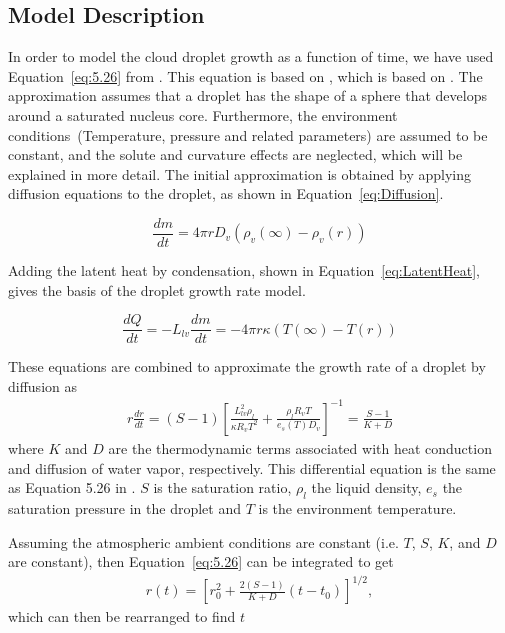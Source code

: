 \documentclass[titlepage]{article}
\begin{document}
\subsection{Model Description}
In order to model the cloud droplet growth as a function of time, we have used
Equation~\eqref{eq:5.26} from \cite{Curry}. This equation is based on
\cite{Mason}, which is based on \cite{Best}. The approximation assumes that a
droplet has the shape of a sphere that develops around a saturated nucleus
core. Furthermore, the environment conditions~(Temperature, pressure and
related parameters) are assumed to be constant, and the solute and curvature
effects are neglected, which will be explained in more detail. The initial
approximation is obtained by applying diffusion equations to the droplet, as
shown in Equation~\eqref{eq:Diffusion}.

\begin{equation}
    \label{eq:Diffusion}
    \dfrac{dm}{dt}=4 \pi r D_{v} \left( \rho_{v}(\infty) - \rho_{v}(r) \right)
\end{equation}

Adding the latent heat by condensation, shown in
Equation~\eqref{eq:LatentHeat}, gives the basis of the droplet growth rate
model.

\begin{equation}
    \label{eq:LatentHeat}
    \dfrac{dQ}{dt}=-L_{lv}\dfrac{dm}{dt}=-4 \pi r \kappa \left( T(\infty) - T(r) \right)
\end{equation}

These equations are combined to approximate the growth rate of a droplet by
diffusion as
\begin{align}
    \label{eq:5.26}
    r \frac{dr}{dt} = (S - 1) \left[ \frac{L_{lv}^2 \rho_l}{\kappa R_v T^2} + \frac{\rho_l R_v T}{e_s(T) D_v} \right] ^{-1} = \frac{S - 1}{K + D}
\end{align}
where $K$ and $D$ are the thermodynamic terms associated with heat conduction
and diffusion of water vapor, respectively. This differential equation is the
same as Equation 5.26 in \cite{Mason}. $S$ is the saturation ratio, $\rho_l$
the liquid density, $e_s$ the saturation pressure in the droplet and $T$ is the
environment temperature.

Assuming the atmospheric ambient conditions are constant (i.e. $T$, $S$, $K$,
and $D$ are constant), then Equation~\eqref{eq:5.26} can be integrated to get
\begin{align}
    \label{eq:5.27}
    r(t) = \left[ r_0^2 + \frac{2(S -1)}{K + D}(t - t_0) \right] ^{1/2},
\end{align}
which can then be rearranged to find $t$
\end{document}
